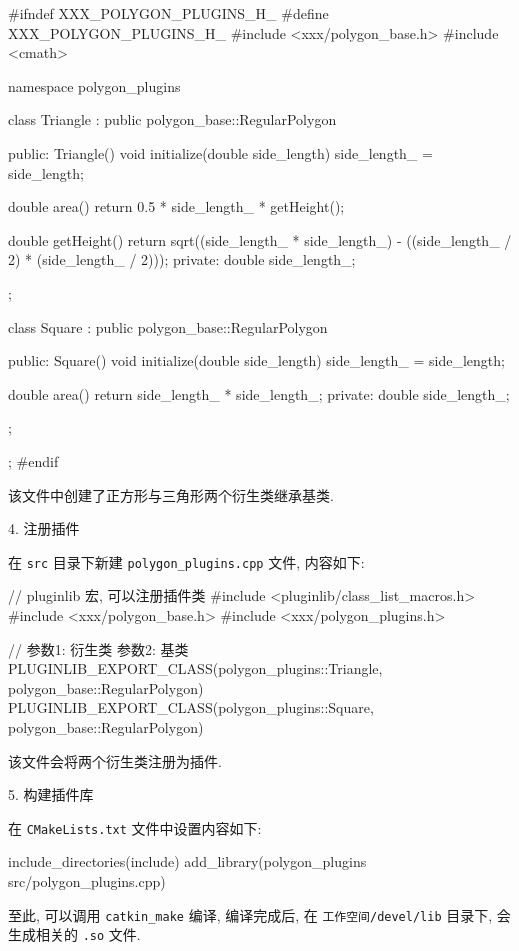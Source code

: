 \documentclass[openany, fontset=windowsold]{ctexbook}
\theoremstyle{kaiti}
\theoremstyle{normal}
\begin{document}
\begin{cpp}
  #ifndef XXX_POLYGON_PLUGINS_H_
  #define XXX_POLYGON_PLUGINS_H_
  #include <xxx/polygon_base.h>
  #include <cmath>

  namespace polygon_plugins
  {
    class Triangle : public polygon_base::RegularPolygon
    {
      public:
        Triangle(){}
        void initialize(double side_length)
        {
          side_length_ = side_length;
        }

        double area()
        {
          return 0.5 * side_length_ * getHeight();
        }

        double getHeight()
        {
          return sqrt((side_length_ * side_length_) - ((side_length_ / 2) * (side_length_ / 2)));
        }
      private:
        double side_length_;
    };

    class Square : public polygon_base::RegularPolygon
    {
      public:
        Square(){}
        void initialize(double side_length)
        {
          side_length_ = side_length;
        }

        double area()
        {
          return side_length_ * side_length_;
        }
      private:
        double side_length_;
    };
  };
  #endif
\end{cpp}

该文件中创建了正方形与三角形两个衍生类继承基类.

4. 注册插件

在 \verb|src| 目录下新建 \verb|polygon_plugins.cpp| 文件, 内容如下:

\begin{cpp}
  // pluginlib 宏, 可以注册插件类
  #include <pluginlib/class_list_macros.h>
  #include <xxx/polygon_base.h>
  #include <xxx/polygon_plugins.h>

  // 参数1: 衍生类 参数2: 基类
  PLUGINLIB_EXPORT_CLASS(polygon_plugins::Triangle, polygon_base::RegularPolygon)
  PLUGINLIB_EXPORT_CLASS(polygon_plugins::Square, polygon_base::RegularPolygon)
\end{cpp}

该文件会将两个衍生类注册为插件.

5. 构建插件库

在 \verb|CMakeLists.txt| 文件中设置内容如下:

\begin{bash}
  include_directories(include)
  add_library(polygon_plugins src/polygon_plugins.cpp)
\end{bash}

至此, 可以调用 \verb|catkin_make| 编译, 编译完成后, 在 \verb|工作空间/devel/lib| 目录下, 会生成相关的 \verb|.so| 文件.
\end{document}
